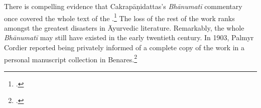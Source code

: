 There is compelling evidence that Cakrapāṇidattas's \emph{Bhānumatī} commentary
once covered the whole text of the \SS.\footcite[IA, 375]{meul-hist}  The loss of
the rest of the work ranks amongst the greatest disasters in Āyurvedic literature.
Remarkably, the whole \emph{Bhānumatī} may still have existed in the early
twentieth century. In 1903, Palmyr Cordier reported being privately informed of a
complete copy of the work in a personal manuscript collection in
Benares.\footcite[332]{cord-1903}


